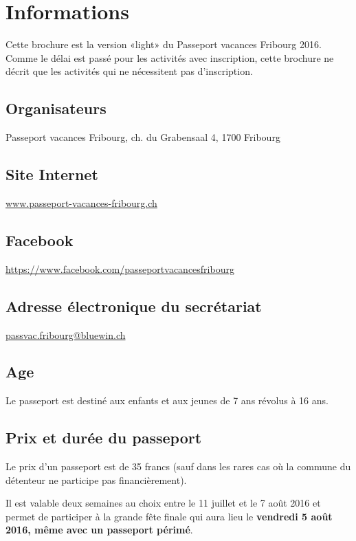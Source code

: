 \chapter{Informations}

Cette brochure est la version «light» du Passeport vacances Fribourg 2016. Comme le délai est passé pour les
activités avec inscription, cette brochure ne décrit que les activités qui ne nécessitent pas d'inscription.

\section*{Organisateurs}

Passeport vacances Fribourg, ch. du Grabensaal 4, 1700 Fribourg

\section*{Site Internet}

\url{www.passeport-vacances-fribourg.ch}

\section*{Facebook}

\url{https://www.facebook.com/passeportvacancesfribourg}

\section*{Adresse électronique du secrétariat}

\url{passvac.fribourg@bluewin.ch}

\section*{Age}

Le passeport est destiné aux enfants et aux jeunes de 7 ans révolus à 16 ans.

\section*{Prix et durée du passeport}

Le prix d'un passeport est de 35 francs (sauf dans les rares cas où la commune du détenteur ne participe pas financièrement). 

Il est valable deux semaines au choix entre le 11 juillet et le 7 août 2016 et permet de participer à la grande fête finale qui aura lieu le \textbf{vendredi 5 août 2016, même avec un passeport périmé}. 


